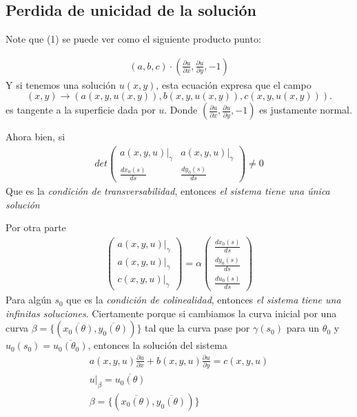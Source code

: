 \documentclass[11pt]{book}
\theoremstyle{plain}
\theoremstyle{definition}
\begin{document}
\subsection*{Perdida de unicidad de la solución}
Note que  (1) se puede ver como el siguiente producto punto:

\begin{align}
    (a,b,c)\cdot(\frac{\partial u}{\partial x}, \frac{\partial u}{\partial y}, -1)
\end{align}
Y si tenemos una solución $u(x,y)$, esta ecuación expresa que el campo
$$(x,y) \to (a(x,y,u(x,y)),b(x,y,u(x,y)),c(x,y,u(x,y))).$$ 
es tangente a la superficie dada por $u$. Donde $(\frac{\partial u}{\partial x}, \frac{\partial u}{\partial y}, -1)$ es justamente normal.

Ahora bien, si
\begin{align}
det
    \begin{pmatrix}
        a(x,y,u)|_{\gamma} & a(x,y,u)|_{\gamma} \\
        \frac{d x_0(s)}{ds} & \frac{d y_0(s)}{ds}
    \end{pmatrix}
    \neq 0
\end{align}
Que es la \emph{condición de transversabilidad}, entonces \emph{el sistema tiene una única solución}

Por otra parte 
\begin{align}
    \begin{pmatrix}
        a(x,y,u)|_{\gamma} \\ a(x,y,u)|_{\gamma} \\ c(x,y,u)|_{\gamma}
    \end{pmatrix}
    =
    \alpha \begin{pmatrix}
        \frac{d x_0(s)}{ds} \\ \frac{d y_0(s)}{ds} \\ \frac{d u_0(s)}{ds}
    \end{pmatrix}
\end{align}
Para algún $s_0$ que es la \emph{condición de colinealidad}, entonces \emph{el sistema tiene una infinitas soluciones}. Ciertamente porque si cambiamos la curva inicial por una curva $\beta = \{(\overline{x_0(\theta)},\overline{y_0(\theta)})\}$ tal que la curva pase por $\gamma(s_0)$ para un $\theta_0$ y $u_0(s_0) = \overline{u_0(\theta_0)}$, entonces la solución del sistema 
\begin{align}
    a(x, y, u) \frac{\partial u}{\partial x} + b(x, y, u) \frac{\partial u}{\partial y} = c(x, y, u)\\
    u|_{\beta} = \overline{u_0(\theta)}\\
    \beta =\{(\overline{x_0(\theta)},\overline{y_0(\theta)})\}
\end{align}
\end{document}
